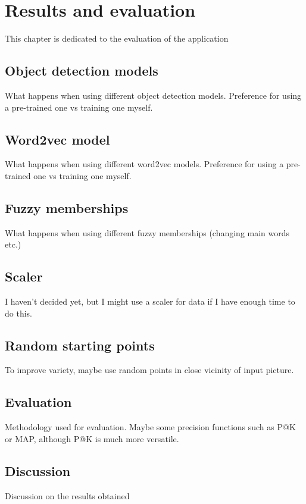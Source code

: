 \chapter{Results and evaluation}
\label{chap:results}

This chapter is dedicated to the evaluation of the application

\section{Object detection models}
\label{sec:results_obj}

What happens when using different object detection models. Preference for using a pre-trained one vs training one myself.

\section{Word2vec model}
\label{sec:results_word2vec}

What happens when using different word2vec models. Preference for using a pre-trained one vs training one myself.

\section{Fuzzy memberships}
\label{sec:results_fuzzy}

What happens when using different fuzzy memberships (changing main words etc.)

\section{Scaler}
\label{sec:results_scaler}

I haven't decided yet, but I might use a scaler for data if I have enough time to do this.

\section{Random starting points}
To improve variety, maybe use random points in close vicinity of input picture.

\section{Evaluation}
\label{sec:results_eval}

Methodology used for evaluation. Maybe some precision functions such as P@K or MAP, although P@K is much more versatile.

\section{Discussion}
\label{sec:results_discussion}

Discussion on the results obtained